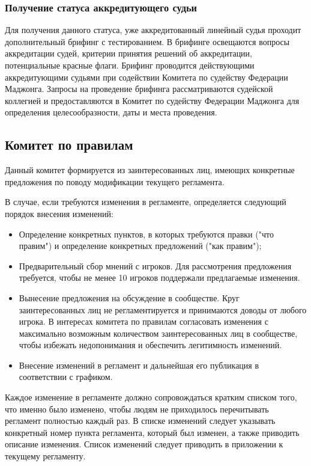 \subsubsection{Получение статуса аккредитующего судьи}

Для получения данного статуса, уже аккредитованный линейный судья проходит дополнительный брифинг с тестированием. В брифинге освещаются вопросы аккредитации судей, критерии принятия решений об аккредитации, потенциальные красные флаги. Брифинг проводится действующими аккредитующими судьями при содействии Комитета по судейству Федерации Маджонга. Запросы на проведение брифинга рассматриваются судейской коллегией и предоставляются в Комитет по судейству Федерации Маджонга для определения целесообразности, даты и места проведения.

\subsection{Комитет по правилам}

Данный комитет формируется из заинтересованных лиц, имеющих конкретные предложения по поводу модификации текущего регламента.

В случае, если требуются изменения в регламенте, определяется следующий порядок внесения изменений:
\begin{itemize}
	\item Определение конкретных пунктов, в которых требуются правки ("что правим") и определение конкретных предложений ("как правим");
	\item Предварительный сбор мнений с игроков. Для рассмотрения предложения требуется, чтобы не менее 10 игроков поддержали предлагаемые изменения.
	\item Вынесение предложения на обсуждение в сообществе. Круг заинтересованных лиц не регламентируется и принимаются доводы от любого игрока. В интересах комитета по правилам согласовать изменения с максимально возможным количеством заинтересованных лиц в сообществе, чтобы избежать недопонимания и обеспечить легитимность изменений.
	\item Внесение изменений в регламент и дальнейшая его публикация в соответствии с графиком.
\end{itemize}

Каждое изменение в регламенте должно сопровождаться кратким списком того, что именно было изменено, чтобы людям не приходилось перечитывать регламент полностью каждый раз. В списке изменений следует указывать конкретный номер пункта регламента, который был изменен, а также приводить описание изменения. Список изменений следует приводить в приложении к текущему регламенту.

